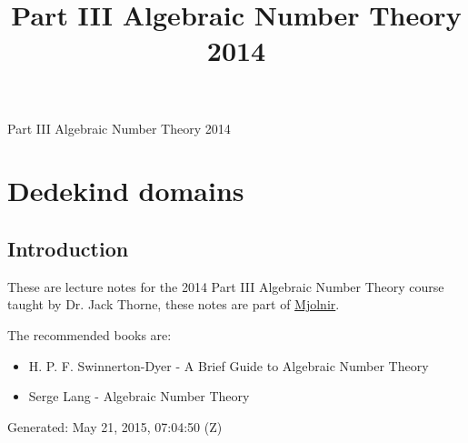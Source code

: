 \documentclass[10pt,]{book}
\title{Part III Algebraic Number Theory 2014}
\author{}
\date{}
\theoremstyle{plain}
\theoremstyle{definition}
\begin{document}
\frontmatter
\thispagestyle{empty}
\begin{center}
{\Huge Part III Algebraic Number Theory 2014}
\end{center}\par
{}
\clearpage
\thispagestyle{empty}
\clearpage
\maketitle
\clearpage
\thispagestyle{empty}
\clearpage
\setcounter{tocdepth}{1}
\renewcommand*\contentsname{Contents}
\tableofcontents
\mainmatter
\typeout{************************************************}
\typeout{************************************************}
\chapter[Dedekind domains]{Dedekind domains}\label{chap-dedekind}
\typeout{************************************************}
\typeout{************************************************}
\section[Introduction]{Introduction}\label{sec-introduction}
These are lecture notes for the 2014 Part III Algebraic Number Theory course taught by Dr. Jack Thorne, these notes are part of \href{https://alexjbest.github.io/mjolnir/}{Mjolnir}.%
\par
The recommended books are: 
          \begin{itemize}
\item{}H. P. F. Swinnerton-Dyer - A Brief Guide to Algebraic Number Theory\item{}Serge Lang - Algebraic Number Theory\end{itemize}

\par

          Generated: May 21, 2015, 07:04:50 (Z)
\typeout{************************************************}
\typeout{************************************************}
\end{document}
